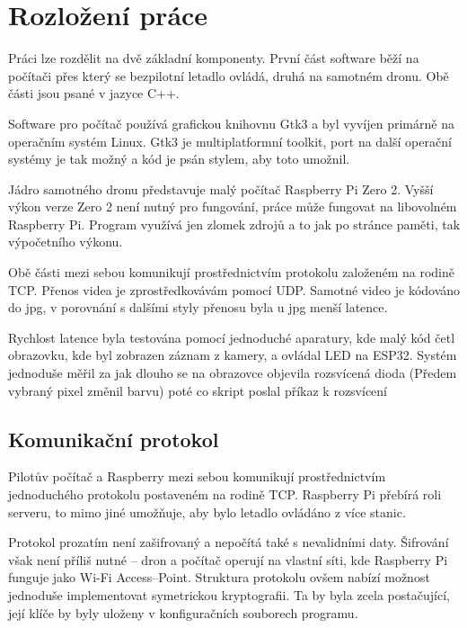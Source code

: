 \documentclass[a4paper,oneside,12pt]{report}
\begin{document}


\tableofcontents


\newpage


\setcounter{page}{1}

\chapter{Rozložení práce}

Práci lze rozdělit na dvě základní komponenty.
První část software běží na počítači přes který se bezpilotní letadlo ovládá, druhá na samotném dronu.
Obě části jsou psané v jazyce C++.

Software pro počítač používá grafickou knihovnu Gtk3 a byl vyvíjen primárně na operačním systém Linux.
Gtk3 je multiplatformní toolkit, port na další operační systémy je tak možný a kód je psán stylem, aby toto umožnil.

Jádro samotného dronu představuje malý počítač Raspberry Pi Zero 2.
Vyšší výkon verze Zero 2 není nutný pro fungování, práce může fungovat na libovolném Raspberry Pi.
Program využívá jen zlomek zdrojů  a to jak po stránce paměti, tak výpočetního výkonu.

Obě části mezi sebou komunikují prostřednictvím protokolu založeném na rodině TCP.
Přenos videa je zprostředkovávám pomocí UDP.
Samotné video je kódováno do jpg, v porovnání s dalšími styly přenosu byla u jpg menší latence.

Rychlost latence byla testována pomocí jednoduché aparatury, kde malý kód četl obrazovku, kde byl zobrazen záznam z kamery, a ovládal LED na ESP32.
Systém jednoduše měřil za jak dlouho se na obrazovce objevila rozsvícená dioda (Předem vybraný pixel změnil barvu) poté co skript poslal příkaz k rozsvícení



\section{Komunikační protokol}

Pilotův počítač a Raspberry mezi sebou komunikují prostřednictvím jednoduchého protokolu postaveném na rodině TCP.
Raspberry Pi přebírá roli serveru, to mimo jiné umožňuje, aby bylo letadlo ovládáno z více stanic.

Protokol prozatím není zašifrovaný a nepočítá také s nevalidními daty.
Šifrování však není příliš nutné -- dron a počítač operují na vlastní síti, kde Raspberry Pi funguje jako Wi-Fi Access--Point.
Struktura protokolu ovšem nabízí možnost jednoduše implementovat symetrickou kryptografii.
Ta by byla zcela postačující, její klíče by byly uloženy v konfiguračních souborech programu.
\end{document}
